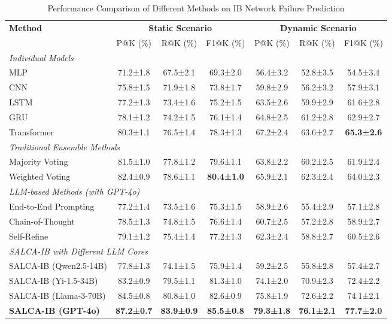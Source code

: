 \documentclass[conference]{IEEEtran}
\begin{document}
\begin{table}[!t]
\caption{Performance Comparison of Different Methods on IB Network Failure Prediction}
\label{tab:main_results}
\renewcommand{\arraystretch}{1.2}
\centering
\begin{tabular}{l|ccc|ccc}
\hline
\multirow{2}{*}{\textbf{Method}} & \multicolumn{3}{c|}{\textbf{Static Scenario}} & \multicolumn{3}{c}{\textbf{Dynamic Scenario}} \\
\cline{2-7}
& P@K (\%) & R@K (\%) & F1@K (\%) & P@K (\%) & R@K (\%) & F1@K (\%) \\
\hline
\multicolumn{7}{l}{\textit{Individual Models}} \\
\hline
MLP & 71.2±1.8 & 67.5±2.1 & 69.3±2.0 & 56.4±3.2 & 52.8±3.5 & 54.5±3.4 \\
CNN & 75.8±1.5 & 71.9±1.8 & 73.8±1.7 & 59.8±2.9 & 56.2±3.2 & 57.9±3.1 \\
LSTM & 77.2±1.3 & 73.4±1.6 & 75.2±1.5 & 63.5±2.6 & 59.9±2.9 & 61.6±2.8 \\
GRU & 78.1±1.2 & 74.2±1.5 & 76.1±1.4 & 64.8±2.5 & 61.2±2.8 & 62.9±2.7 \\
Transformer & 80.3±1.1 & 76.5±1.4 & 78.3±1.3 & 67.2±2.4 & 63.6±2.7 & \textbf{65.3±2.6} \\
\hline
\multicolumn{7}{l}{\textit{Traditional Ensemble Methods}} \\
\hline
Majority Voting & 81.5±1.0 & 77.8±1.2 & 79.6±1.1 & 63.8±2.2 & 60.2±2.5 & 61.9±2.4 \\
Weighted Voting & 82.4±0.9 & 78.6±1.1 & \textbf{80.4±1.0} & 65.9±2.1 & 62.3±2.4 & 64.0±2.3 \\
\hline
\multicolumn{7}{l}{\textit{LLM-based Methods (with GPT-4o)}} \\
\hline
End-to-End Prompting & 77.2±1.4 & 73.5±1.6 & 75.3±1.5 & 58.9±2.6 & 55.4±2.9 & 57.1±2.8 \\
Chain-of-Thought & 78.5±1.3 & 74.8±1.5 & 76.6±1.4 & 60.7±2.5 & 57.2±2.8 & 58.9±2.7 \\
Self-Refine & 79.1±1.2 & 75.4±1.4 & 77.2±1.3 & 62.3±2.4 & 58.8±2.7 & 60.5±2.6 \\
\hline
\multicolumn{7}{l}{\textit{SALCA-IB with Different LLM Cores}} \\
\hline
SALCA-IB (Qwen2.5-14B) & 77.8±1.3 & 74.1±1.5 & 75.9±1.4 & 59.2±2.5 & 55.8±2.8 & 57.4±2.7 \\
SALCA-IB (Yi-1.5-34B) & 83.2±0.9 & 79.5±1.1 & 81.3±1.0 & 74.1±2.0 & 70.9±2.3 & 72.4±2.2 \\
SALCA-IB (Llama-3-70B) & 84.5±0.8 & 80.8±1.0 & 82.6±0.9 & 75.8±1.9 & 72.6±2.2 & 74.1±2.1 \\
\textbf{SALCA-IB (GPT-4o)} & \textbf{87.2±0.7} & \textbf{83.9±0.9} & \textbf{85.5±0.8} & \textbf{79.3±1.8} & \textbf{76.1±2.1} & \textbf{77.7±2.0} \\

\hline
\end{tabular}
\end{table}
\end{document}
